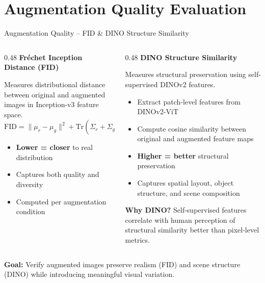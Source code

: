 \documentclass[aspectratio=169, 10pt]{beamer}
\begin{document}
\section{Augmentation Quality Evaluation}

\begin{frame}{Augmentation Quality -- FID \& DINO Structure Similarity}
\begin{columns}[T]
\begin{column}{0.48\textwidth}
\textbf{\textcolor{boxblue}{Fr\'{e}chet Inception Distance (FID)}}

\vspace{0.3em}
Measures distributional distance between original and augmented images in Inception-v3 feature space.
\[
\mathrm{FID} = \|\mu_r - \mu_g\|^2 + \mathrm{Tr}\!\left(\Sigma_r + \Sigma_g - 2(\Sigma_r \Sigma_g)^{1/2}\right)
\]

\vspace{0.3em}
\begin{itemize}
    \item \textbf{Lower = closer} to real distribution
    \item Captures both quality and diversity
    \item Computed per augmentation condition
\end{itemize}
\end{column}
\begin{column}{0.48\textwidth}
\textbf{\textcolor{boxorange}{DINO Structure Similarity}}

\vspace{0.3em}
Measures structural preservation using self-supervised DINOv2 features.

\vspace{0.3em}
\begin{itemize}
    \item Extract patch-level features from DINOv2-ViT
    \item Compute cosine similarity between original and augmented feature maps
    \item \textbf{Higher = better} structural preservation
    \item Captures spatial layout, object structure, and scene composition
\end{itemize}

\vspace{0.3em}
{\footnotesize \textbf{Why DINO?} Self-supervised features correlate with human perception of structural similarity better than pixel-level metrics.}
\end{column}
\end{columns}

\vspace{0.6em}
\centering
{\footnotesize \textbf{Goal:} Verify augmented images preserve realism (FID) and scene structure (DINO) while introducing meaningful visual variation.}
\end{frame}
\end{document}
